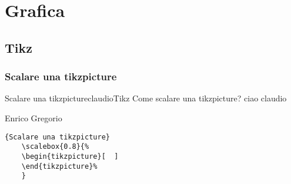 \chapter{Grafica}
\label{chap:grafica}
\section{Tikz}
\label{sec:rikz}
\subsection{Scalare una tikzpicture}

%
\begin{domanda}{Scalare una tikzpicture}{claudio}{Tikz}
	Come scalare  una tikzpicture?
	ciao
	claudio 
\end{domanda}

\begin{risposta}{Enrico Gregorio}
	\begin{lstlisting}{Scalare una tikzpicture}
	\scalebox{0.8}{%
	\begin{tikzpicture}[  ]
	\end{tikzpicture}%
	}
	\end{lstlisting}
\end{risposta}
